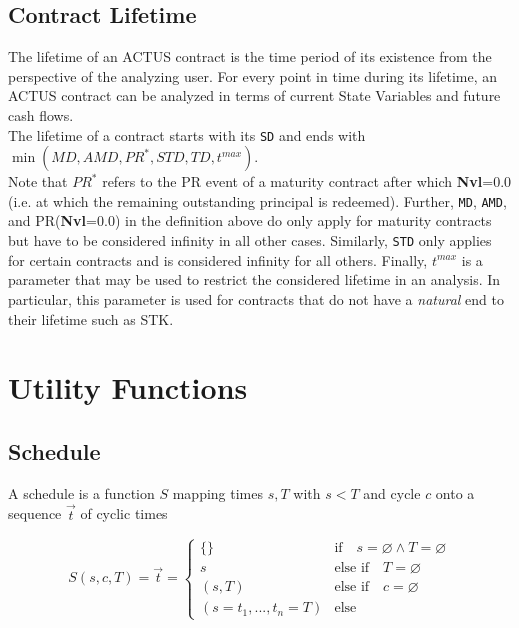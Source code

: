 \documentclass[9pt,oneside]{amsart}
\newcommand{\attr}[1]{\texttt{#1}}
\newcommand{\sdl}[3]{S(#1,#2,#3)}
\newcommand{\undef}{\varnothing}
\newcommand{\tmax}{t^{max}}
\begin{document}
\begin{multicols}{2}
\subsection{Contract Lifetime}\label{sec:lifetime}

The lifetime of an ACTUS contract is the time period of its existence from the perspective of the analyzing user. For every point in time during its lifetime, an ACTUS contract can be analyzed in terms of current State Variables and future cash flows.\\

The lifetime of a contract starts with its \attr{SD} and ends with $\min(MD, AMD, PR^*, STD, TD,\tmax)$.\\

Note that $PR^*$ refers to the PR event of a maturity contract after which \textbf{Nvl}=0.0 (i.e. at which the remaining outstanding principal is redeemed). Further, \attr{MD}, \attr{AMD}, and PR(\textbf{Nvl}=0.0) in the definition above do only apply for maturity contracts but have to be considered infinity in all other cases. Similarly, \attr{STD} only applies for certain contracts and is considered infinity for all others. Finally, $\tmax$ is a parameter that may be used to restrict the considered lifetime in an analysis. In particular, this parameter is used for contracts that do not have a \textit{natural} end to their lifetime such as STK.



\section{Utility Functions}\label{sec:utils}


\subsection{Schedule}\label{sec:schedule}

A schedule is a function $S$ mapping times $s,T$ with $s<T$ and cycle $c$ onto a sequence $\vec{t}$ of cyclic times

\[
	\sdl{s}{c}{T}=\vec{t}=\begin{cases} \{\} & \text{if}\quad s=\undef\land T=\undef\\ 
					s & \text{else if}\quad T=\undef\\
					(s,T) & \text{else if}\quad c=\undef\\
					(s=t_1,...,t_n=T) & \text{else} \end{cases}
\]


\end{multicols}
\end{document}
